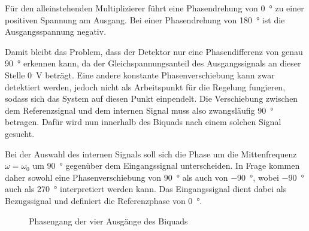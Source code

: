 \documentclass[../main.tex]{subfiles}
\begin{document}
Für den alleinstehenden Multiplizierer führt eine Phasendrehung von \SI{0}{\degree} zu einer positiven Spannung am Ausgang. Bei einer Phasendrehung von \SI{180}{\degree} ist die Ausgangsspannung negativ. \cite{YT_stf_lecture23} \par
\medskip

Damit bleibt das Problem, dass der Detektor nur eine Phasendifferenz von genau \SI{90}{\degree} erkennen kann, da der Gleichspannungsanteil des Ausgangssignals an dieser Stelle \SI{0}{\volt} beträgt. Eine andere konstante Phasenverschiebung kann zwar detektiert werden, jedoch nicht als Arbeitspunkt für die Regelung fungieren, sodass sich das System auf diesen Punkt einpendelt. Die Verschiebung zwischen dem Referenzsignal und dem internen Signal muss also zwangsläufig \SI{90}{\degree} betragen. Dafür wird nun innerhalb des Biquads nach einem solchen Signal gesucht.\par
\medskip

Bei der Auswahl des internen Signals soll sich die Phase um die Mittenfrequenz $\omega=\omega_0$ um \SI{90}{\degree} gegenüber dem Eingangssignal unterscheiden. In Frage kommen daher sowohl eine Phasenverschiebung von \SI{90}{\degree} als auch von \SI{-90}{\degree}, wobei \SI{-90}{\degree} auch als \SI{270}{\degree} interpretiert werden kann. Das Eingangssignal dient dabei als Bezugssignal und definiert die Referenzphase von \SI{0}{\degree}.\par
\medskip


\begin{figure}[H]
    \centering
    \caption{Phasengang der vier Ausgänge des Biquads}
    \label{fig:phaseshift}
\end{figure}
\end{document}
